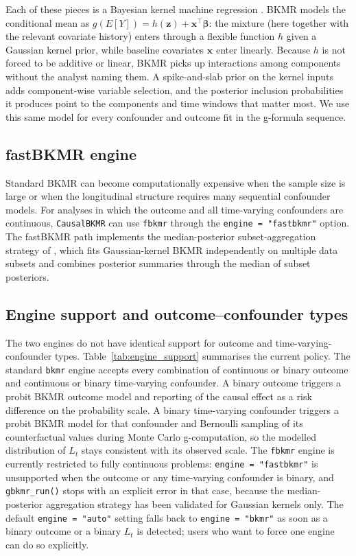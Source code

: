 \documentclass[11pt]{article}
\newcommand{\pkg}[1]{\texttt{#1}}
\newcommand{\code}[1]{\texttt{#1}}
\begin{document}
Each of these pieces is a Bayesian kernel machine regression \citep{bobb_bkmr_2015}. BKMR models the conditional mean as $g(E[Y]) = h(\mathbf{z}) + \mathbf{x}^\top\boldsymbol{\beta}$: the mixture (here together with the relevant covariate history) enters through a flexible function $h$ given a Gaussian kernel prior, while baseline covariates $\mathbf{x}$ enter linearly. Because $h$ is not forced to be additive or linear, BKMR picks up interactions among components without the analyst naming them. A spike-and-slab prior on the kernel inputs adds component-wise variable selection, and the posterior inclusion probabilities it produces point to the components and time windows that matter most. We use this same model for every confounder and outcome fit in the g-formula sequence.

\subsection*{fastBKMR engine}
Standard BKMR can become computationally expensive when the sample size is large or when the longitudinal structure requires many sequential confounder models. For analyses in which the outcome and all time-varying confounders are continuous, \pkg{CausalBKMR} can use \pkg{fbkmr} through the \code{engine = "fastbkmr"} option. The fastBKMR path implements the median-posterior subset-aggregation strategy of \citet{sonabend_fastbkmr_2026}, which fits Gaussian-kernel BKMR independently on multiple data subsets and combines posterior summaries through the median of subset posteriors.

\subsection*{Engine support and outcome--confounder types}
The two engines do not have identical support for outcome and time-varying-confounder types. Table~\ref{tab:engine_support} summarises the current policy. The standard \pkg{bkmr} engine accepts every combination of continuous or binary outcome and continuous or binary time-varying confounder. A binary outcome triggers a probit BKMR outcome model and reporting of the causal effect as a risk difference on the probability scale. A binary time-varying confounder triggers a probit BKMR model for that confounder and Bernoulli sampling of its counterfactual values during Monte Carlo g-computation, so the modelled distribution of $L_t$ stays consistent with its observed scale. The \pkg{fbkmr} engine is currently restricted to fully continuous problems: \code{engine = "fastbkmr"} is unsupported when the outcome or any time-varying confounder is binary, and \code{gbkmr\_run()} stops with an explicit error in that case, because the median-posterior aggregation strategy has been validated for Gaussian kernels only. The default \code{engine = "auto"} setting falls back to \code{engine = "bkmr"} as soon as a binary outcome or a binary $L_t$ is detected; users who want to force one engine can do so explicitly.
\end{document}
